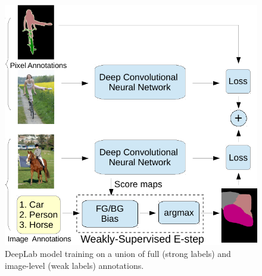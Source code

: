 \begin{figure}[htbp!]
  \centering
  \includegraphics[width=0.9\linewidth]{fig/model_train_twoEnd.pdf} 
  \caption{DeepLab model training on a union of full (strong labels) 
    and image-level (weak labels) annotations.}
  \label{fig:model_illustrations_twoEnd}
\end{figure}


